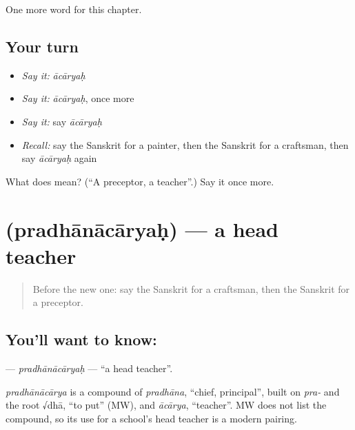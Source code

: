 \begin{grammarlens}[title={What you've built}]
One more word for this chapter.
\end{grammarlens}

\subsection*{Your turn}
\begin{itemize}
\raggedright
  \item \emph{Say it:} \emph{ācāryaḥ}
  \item \emph{Say it:} \emph{ācāryaḥ}, once more
  \item \emph{Say it:} say \emph{ācāryaḥ}
  \item \emph{Recall:} say the Sanskrit for a painter, then the Sanskrit for a craftsman, then say \emph{ācāryaḥ} again
\end{itemize}

\begin{tcolorbox}[breakable,colback=teal!4,colframe=teal!35!black,title={Before you move on}]
What does  mean? (\textquotedblleft{}A preceptor, a teacher\textquotedblright{}.) Say it once more.
\end{tcolorbox}
\section[\texorpdfstring{\sk{प्रधानाचार्यः} (pradhānācāryaḥ)}{प्रधानाचार्यः (pradhānācāryaḥ)}]{ (pradhānācāryaḥ) — a head teacher}

\label{lesson:SA-C210-pradhanacaryah}



\begin{quote}
Before the new one: say the Sanskrit for a craftsman, then the Sanskrit for a preceptor.
\end{quote}

\subsection*{You'll want to know: }
\textbf{} — \emph{pradhānācāryaḥ} — \textquotedblleft{}a head teacher\textquotedblright{}.

\begin{cousinweb}
\emph{pradhānācārya} is a compound of \emph{pradhāna}, \textquotedblleft{}chief, principal\textquotedblright{}, built on \emph{pra-} and the root √dhā, \textquotedblleft{}to put\textquotedblright{} (MW), and \emph{ācārya}, \textquotedblleft{}teacher\textquotedblright{}. MW does not list the compound, so its use for a school's head teacher is a modern pairing.
\end{cousinweb}

